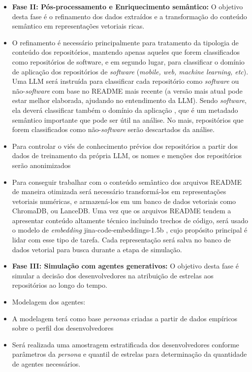 \documentclass[12pt,oneside,a4paper,brazil,sumario=tradicional]{abntex2}
\begin{document}
\begin{itemize}
  \item \textbf{Fase II: Pós-processamento e Enriquecimento semântico: }O objetivo desta fase é o refinamento dos dados extraídos e a transformação do conteúdo semântico em representações vetoriais ricas.
  \item O refinamento é necessário principalmente para tratamento da tipologia de conteúdo dos repositórios, mantendo apenas aqueles que forem classificados como repositórios de software, e em segundo lugar, para classificar o domínio de aplicação dos repositórios de \textit{software }(\textit{mobile, web, machine learning, etc}). Uma LLM será instruída para classificar cada repositório como \textit{software }ou não-\textit{software} com base no README mais recente (a versão mais atual pode estar melhor elaborada, ajudando no entendimento da LLM). Sendo \textit{software}, ela deverá classificar também o domínio da aplicação \cite{borges2018}, que é um metadado semântico importante que pode ser útil na análise. No mais, repositórios que forem classificados como não-\textit{software }serão descartados da análise.
  \item Para controlar o viés de conhecimento prévios dos repositórios a partir dos dados de treinamento da própria LLM, os nomes e menções dos repositórios serão anonimizados
  \item Para conseguir trabalhar com o conteúdo semântico dos arquivos README de maneira otimizada será necessário transformá-los em representações vetoriais numéricas, e armazená-los em um banco de dados vetoriais como ChromaDB, ou LanceDB. Uma vez que os arquivos README tendem a apresentar conteúdo altamente técnico incluindo trechos de código, será usado o modelo de \textit{embedding }jina-code-embeddings-1.5b \cite{kryvosheieva2025}, cujo propósito principal é lidar com esse tipo de  tarefa. Cada representação será salva no banco de dados vetorial para busca durante a etapa de simulação.
  \item \textbf{Fase III: Simulação com agentes generativos:} O objetivo desta fase é simular a decisão dos desenvolvedores na atribuição de estrelas aos repositórios ao longo do tempo.
  \item Modelagem dos agentes:
  \item A modelagem terá como base \textit{personas }criadas a partir de dados empíricos sobre o perfil dos desenvolvedores \cite{borges2018, stackoverflow2025, github2025}
  \item Será realizada uma amostragem estratificada dos desenvolvedores conforme parâmetros da \textit{persona }e quantil de estrelas para determinação da quantidade de agentes necessários.

\end{itemize}
\end{document}
